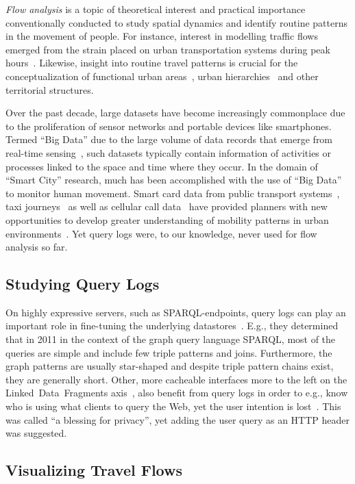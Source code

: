 \documentclass{sig-alternate}
\newcommand{\sparql}{{SPARQL}\xspace}
\begin{document}
\emph{Flow analysis} is a topic of theoretical interest and practical importance conventionally conducted to study spatial dynamics and identify routine patterns in the movement of people.
For instance, interest in modelling traffic flows emerged from the strain placed on urban transportation systems during peak hours~\cite{roth,ferreira}.
Likewise, insight into routine travel patterns is crucial for the conceptualization of functional urban areas~\cite{servillo2013town}, urban hierarchies~\cite{christaller1966central} and other territorial structures.

Over the past decade, large datasets have become increasingly commonplace due to the proliferation of sensor networks and portable devices like smartphones.
Termed ``Big Data'' due to the large volume of data records that emerge from real-time sensing~\cite{kitchin}, such datasets typically contain information of activities or processes linked to the space and time where they occur.
In the domain of ``Smart City'' research, much has been accomplished with the use of ``Big Data'' to monitor human movement.
Smart card data from public transport systems~\cite{roth,beecham}, taxi journeys~\cite{ferreira} as well as cellular call data~\cite{sevtsuk} have provided planners with new opportunities to develop greater understanding of mobility patterns in urban environments~\cite{batty}.
Yet query logs were, to our knowledge, never used for flow analysis so far.

\subsection{Studying Query Logs}

On highly expressive servers, such as \sparql-endpoints, query logs can play an important role in fine-tuning the underlying datastores~\cite{arias2011empirical}.
E.g., they determined that in 2011 in the context of the graph query language \sparql, most of the queries are simple and include few triple patterns and joins.
Furthermore, the graph patterns are usually star-shaped and despite triple pattern chains exist, they are generally short.
Other, more cacheable interfaces more to the left on the Linked~Data~Fragments axis~\cite{ldf}, also benefit from query logs in order to e.g., know who is using what clients to query the Web, yet the user intention is lost~\cite{usewod2015}.
This was called ``a blessing for privacy'', yet adding the user query as an HTTP header was suggested.

\subsection{Visualizing Travel Flows}
\end{document}
